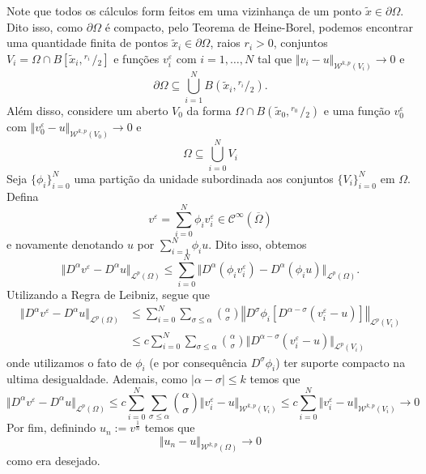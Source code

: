 \documentclass[a4paper, 11pt]{book}
\theoremstyle{definition}
\newcommand{\cC}{\mathcal{C}}
\newcommand{\cL}{\mathcal{L}}
\newcommand{\cW}{\mathcal{W}}
\newcommand{\sfrac}[2]{{}^{#1}\!\!/\!_{#2}}
\begin{document}
\begin{prf}
    Note que todos os cálculos form feitos em uma vizinhança de um ponto $\tilde x \in \partial\Omega$. Dito isso, como $\partial \Omega$ é compacto, pelo Teorema de Heine-Borel, podemos encontrar uma quantidade finita de pontos $\tilde x_i \in \partial \Omega$, raios $r_i > 0$, conjuntos $V_i = \Omega \cap B[\tilde x_i,\sfrac{r_i\,}{2}]$ e funções $v_i^\varepsilon$ com $i = 1,\dots,N$ tal que $\Vert v_i - u \Vert_{\cW^{k,p}(V_i)} \to 0$ e 
    \[
        \partial\Omega \subseteq \bigcup_{i=1}^N B(\tilde x_i, \sfrac{r_i}{2}).
    \]
    Além disso, considere um aberto $V_0$ da forma $\Omega \cap B(\tilde x_0, \sfrac{r_0\,}{2})$ e uma função $v^\varepsilon_0$ com $\Vert v^\varepsilon_0 - u \Vert_{\cW^{k,p}(V_0)} \to 0$ e
    \[
        \Omega \subseteq \bigcup_{i=0}^N V_i
    \]
    Seja $\{\phi_i\}_{i=0}^N$ uma partição da unidade subordinada aos conjuntos $\{V_i\}_{i=0}^N$ em $\Omega$.
    Defina
    \[
        v^\varepsilon = \sum_{i=0}^N \phi_i v_i^\varepsilon \in \cC^{\infty}(\overline\Omega)
    \]
    e novamente denotando $u$ por $\sum_{i=1}^N \phi_i u$. Dito isso, obtemos
    \[
        \Vert D^\alpha v^\varepsilon - D^\alpha u \Vert_{\cL^p(\Omega)} \leqslant \sum_{i=0}^N \Vert D^\alpha (\phi_i v_i^\varepsilon) - D^\alpha(\phi_i u) \Vert_{\cL^p(\Omega)}.
    \]
    Utilizando a Regra de Leibniz, segue que
    \[
        \begin{aligned}
            \Vert D^\alpha v^\varepsilon - D^\alpha u \Vert_{\cL^p(\Omega)} &\leqslant \sum_{i=0}^N\sum_{\sigma \leqslant \alpha} \binom{\alpha}{\sigma} \left\Vert  D^{\sigma} \phi_i \left[ D^{\alpha - \sigma} \left( v_i^\varepsilon - u \right) \right] \right\Vert _{\cL^p(V_i)}\\ 
            &\leqslant c\sum_{i=0}^N\sum_{\sigma \leqslant \alpha} \binom{\alpha}{\sigma} \Vert D^{\alpha-\sigma}(v^\varepsilon_i - u) \Vert_{\cL^p(V_i)}
        \end{aligned}
    \]
    onde utilizamos o fato de $\phi_i$ (e por consequência $D^\sigma \phi_i$) ter suporte compacto na ultima desigualdade. 
    Ademais, como $|\alpha - \sigma| \leqslant k$ temos que
    \[
        \Vert D^\alpha v^\varepsilon - D^\alpha u \Vert_{\cL^p(\Omega)} \leqslant c \sum_{i=0}^N\sum_{\sigma \leqslant \alpha} \binom{\alpha}{\sigma} \Vert v_i^\varepsilon - u \Vert_{\cW^{k,p}(V_i)} \leqslant c\sum_{i=0}^N \Vert v_i^\varepsilon - u \Vert_{\cW^{k,p}(V_i)} \to 0 
    \]
    Por fim, definindo $u_n := v^{\frac{1}{n}}$ temos que
    \[
        \Vert u_n - u \Vert_{\cW^{k,p}(\Omega)} \to 0
    \]
    como era desejado.
\end{prf}
\end{document}
